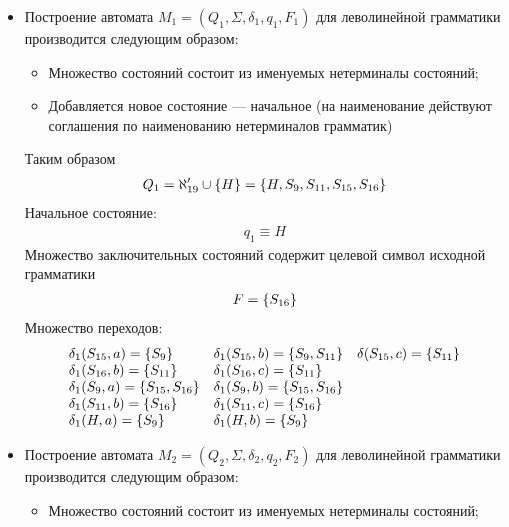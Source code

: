 \begin{itemize}
	\item Построение автомата \(M_1 = (Q_1, \Sigma, \delta_1, q_1, F_1)\) для леволинейной грамматики производится следующим образом:
	      \begin{itemize}
		      \item Множество состояний состоит из именуемых нетерминалы состояний;
		      \item Добавляется новое состояние --- начальное (на наименование действуют соглашения по наименованию нетерминалов грамматик)
	      \end{itemize}
	      Таким образом
	      \begin{align*}
		      Q_1 = \aleph'_{19} \cup \left\{H\right\} = \left\{H, S_9, S_{11}, S_{15}, S_{16}\right\}
	      \end{align*}
	      Начальное состояние:
	      \begin{align*}
		      q_1 \equiv H
	      \end{align*}
	      Множество заключительных состояний содержит целевой символ исходной грамматики
	      \begin{align*}
		      F = \left\{S_{16}\right\}
	      \end{align*}
	      Множество переходов:
	      \begin{align*}
		      \begin{array}{lll}
			      \delta_1(S_{15}, a) = \left\{S_9\right\}           & \delta_1(S_{15}, b) = \left\{S_9, S_{11}\right\}   & \delta(S_{15}, c) = \left\{S_{11}\right\} \\
			      \delta_1(S_{16}, b) = \left\{S_{11}\right\}        & \delta_1(S_{16}, c) = \left\{S_{11}\right\}                                           \\
			      \delta_1(S_{9}, a) = \left\{S_{15}, S_{16}\right\} & \delta_1(S_{9}, b) = \left\{S_{15}, S_{16}\right\}                                    \\
			      \delta_1(S_{11}, b) = \left\{S_{16}\right\}        & \delta_1(S_{11}, c) = \left\{S_{16}\right\}                                           \\
			      \delta_1(H, a) = \left\{S_{9}\right\}              & \delta_1(H, b) = \left\{S_{9}\right\}
		      \end{array}
	      \end{align*}
	\item Построение автомата \(M_2 = (Q_2, \Sigma, \delta_2, q_2, F_2)\) для леволинейной грамматики производится следующим образом:
	      \begin{itemize}
		      \item Множество состояний состоит из именуемых нетерминалы состояний;

\end{itemize}
\end{itemize}
